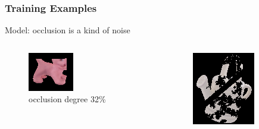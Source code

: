 \documentclass[xcolor=dvipsnames]{beamer}
\begin{document}
\begin{frame}
	\frametitle{Training Examples}
	\Large
	Model: occlusion is a kind of noise
	
	\normalsize
	\begin{columns}
		\begin{column}{.5\textwidth}
			\begin{figure}
				\includegraphics[width=\textwidth]{img/rgb_00788.png}
				\caption{occlusion degree 32\%}
			\end{figure}
		\end{column}
		\begin{column}{.5\textwidth}
			\begin{figure}
				\includegraphics[width=\textwidth]{img/rgb_00755.png}

\end{figure}
\end{column}
\end{columns}
\end{frame}
\end{document}
